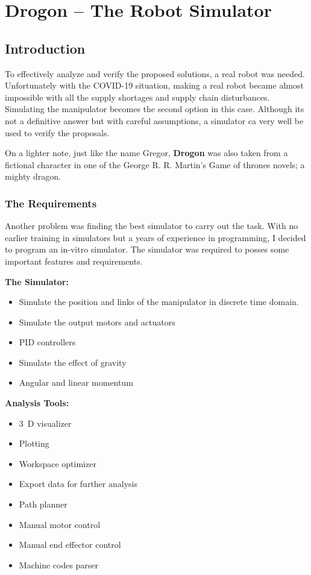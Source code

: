 \section{Drogon -- The Robot Simulator}\label{Chapter:Drogon}
{
    \subsection{Introduction}

    To effectively analyze and verify the proposed solutions, a real robot was needed. Unfortunately with the COVID-19 situation, making a real robot became almost impossible with all the supply shortages and supply chain disturbances. Simulating the manipulator becomes the second option in this case. Although its not a definitive answer but with careful assumptions, a simulator ca very well be used to verify the proposals.

    On a lighter note, just like the name Gregor, \textbf{Drogon} was also taken from a fictional character in one of the George R. R. Martin's Game of thrones novels; a mighty dragon.

    \subsubsection{The Requirements}
    Another problem was finding the best simulator to carry out the task. With no earlier training in simulators but a years of experience in programming, I decided to program an in-vitro simulator. The simulator was required to posses some important features and requirements.

    \textbf{The Simulator:}
    \begin{itemize}
      \item Simulate the position and links of the manipulator in discrete time domain.
      \item Simulate the output motors and actuators
      \item PID controllers
      \item Simulate the effect of gravity
      \item Angular and linear momentum
    \end{itemize}

    \textbf{Analysis Tools:}
    \begin{itemize}
      \item $3$~D visualizer
      \item Plotting
      \item Workspace optimizer
      \item Export data for further analysis
      \item Path planner
      \item Manual motor control
      \item Manual end effector control
      \item Machine codes parser
    \end{itemize}

}
